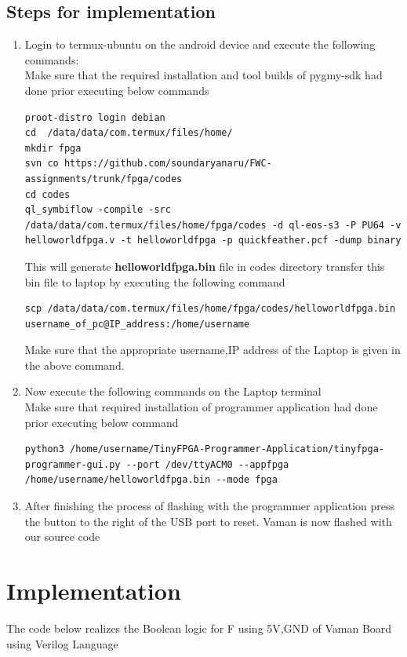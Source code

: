 \documentclass[10pt, a4paper]{article}
\begin{document}
\subsection{Steps for implementation}
\begin{enumerate}
\item Login to termux-ubuntu on the android device and execute the following commands:\\
Make sure that the required installation and tool builds of pygmy-sdk had done prior executing below commands
\begin{lstlisting}
proot-distro login debian
cd  /data/data/com.termux/files/home/
mkdir fpga
svn co https://github.com/soundaryanaru/FWC-assignments/trunk/fpga/codes
cd codes
ql_symbiflow -compile -src /data/data/com.termux/files/home/fpga/codes -d ql-eos-s3 -P PU64 -v helloworldfpga.v -t helloworldfpga -p quickfeather.pcf -dump binary
\end{lstlisting}
This will generate \textbf{helloworldfpga.bin} file in codes directory transfer this bin file to laptop by executing the following command
\begin{lstlisting}
scp /data/data/com.termux/files/home/fpga/codes/helloworldfpga.bin username_of_pc@IP_address:/home/username
\end{lstlisting}
Make sure that the appropriate username,IP address of the Laptop is given in the above command.
\item Now execute the following commands on the Laptop terminal\\
Make sure that required installation of programmer application had done prior executing below command
\begin{lstlisting}
python3 /home/username/TinyFPGA-Programmer-Application/tinyfpga-programmer-gui.py --port /dev/ttyACM0 --appfpga /home/username/helloworldfpga.bin --mode fpga
\end{lstlisting}
\item After finishing the process of flashing with the programmer application press the button to the right of the USB port to reset. Vaman is now flashed with our source code
\end{enumerate}
\section{Implementation}
The code below realizes the Boolean logic for F   using 5V,GND of Vaman Board using Verilog Language
\begin{center}
\end{center}
\end{document}
